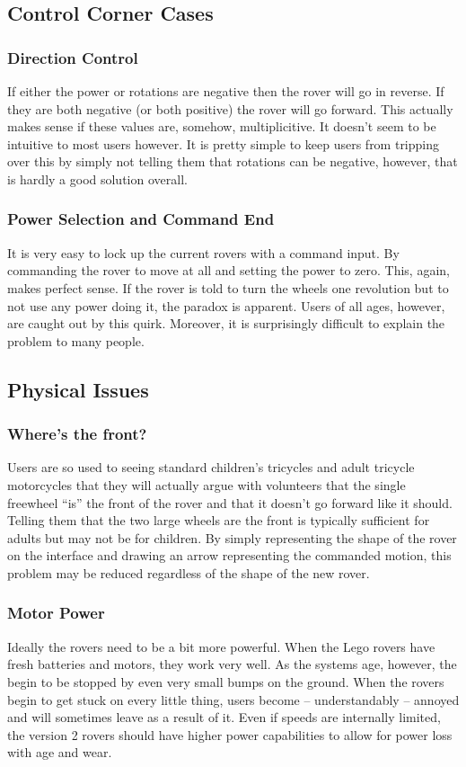 \documentclass[letterpaper,10pt]{article}
\begin{document}
  \subsection{Control Corner Cases}
    \subsubsection{Direction Control}
      If either the power or rotations are negative then the rover will go in reverse.  If they are both negative (or both positive) the rover will go forward.  This actually makes sense if these values are, somehow, multiplicitive.  It doesn't seem to be intuitive to most users however.  It is pretty simple to keep users from tripping over this by simply not telling them that rotations can be negative, however, that is hardly a good solution overall.
      
    \subsubsection{Power Selection and Command End}
      It is very easy to lock up the current rovers with a command input.  By commanding the rover to move at all and setting the power to zero.  This, again, makes perfect sense.  If the rover is told to turn the wheels one revolution but to not use any power doing it, the paradox is apparent.  Users of all ages, however, are caught out by this quirk.  Moreover, it is surprisingly difficult to explain the problem to many people.
      
  \subsection{Physical Issues}
    \subsubsection{Where's the front?}
      Users are so used to seeing standard children's tricycles and adult tricycle motorcycles that they will actually argue with volunteers that the single freewheel ``is'' the front of the rover and that it doesn't go forward like it should.  Telling them that the two large wheels are the front is typically sufficient for adults but may not be for children.  By simply representing the shape of the rover on the interface and drawing an arrow representing the commanded motion, this problem may be reduced regardless of the shape of the new rover.
      
    \subsubsection{Motor Power}
      Ideally the rovers need to be a bit more powerful.  When the Lego rovers have fresh batteries and motors, they work very well.  As the systems age, however, the begin to be stopped by even very small bumps on the ground.  When the rovers begin to get stuck on every little thing, users become -- understandably -- annoyed and will sometimes leave as a result of it.  Even if speeds are internally limited, the version 2 rovers should have higher power capabilities to allow for power loss with age and wear.
      
\end{document}
